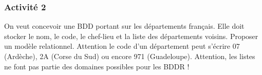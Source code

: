 \documentclass[french,11pt,twoside]{VcCours}
\begin{document}
\subsubsection*{Activité 2} %

On veut concevoir une BDD portant sur les départements français. Elle doit stocker le nom, le code, le chef-lieu et la liste des départements voisins. Proposer un modèle relationnel. Attention le code d'un département peut s'écrire 07 (Ardèche), 2A (Corse du Sud) ou encore 971 (Guadeloupe). Attention, les listes ne font pas partie des domaines possibles pour les BDDR ! 







 

\end{document}
